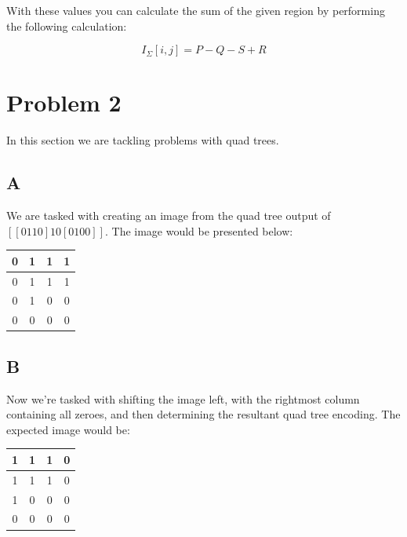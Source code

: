 \documentclass{article}
\begin{document}
With these values you can calculate the sum of the given region by performing the following calculation:

\begin{equation}
    I_\Sigma[i,j] = P - Q - S + R
\end{equation}

\section*{Problem 2}

In this section we are tackling problems with quad trees.

\subsection*{A}

We are tasked with creating an image from the quad tree output of $[[0110]10[0100]]$. The image would be presented below:

\begin{center}
    \begin{tabular}{ | c | c | c | c | }
        \hline
        0 & 1 & 1 & 1 \\ 
        \hline
        0 & 1 & 1 & 1 \\ 
        \hline
        0 & 1 & 0 & 0 \\ 
        \hline
        0 & 0 & 0 & 0 \\ 
        \hline  
    \end{tabular}
\end{center}

\subsection*{B}

Now we're tasked with shifting the image left, with the rightmost column containing all zeroes, and then determining the resultant quad tree encoding. The expected image would be:

\begin{center}
    \begin{tabular}{ | c | c | c | c | }
        \hline
        1 & 1 & 1 & 0 \\ 
        \hline
        1 & 1 & 1 & 0 \\ 
        \hline
        1 & 0 & 0 & 0 \\ 
        \hline
        0 & 0 & 0 & 0 \\ 
        \hline  
    \end{tabular}
\end{center}
\end{document}
